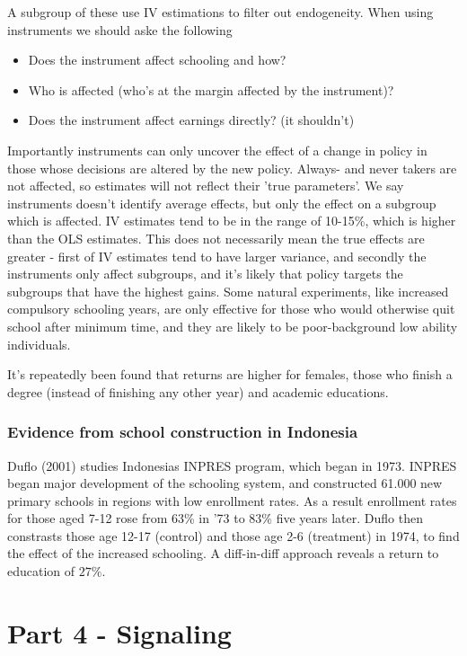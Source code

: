\documentclass[12pt, a4paper]{article}
\begin{document}
\begin{multicols}{2}
A subgroup of these use IV estimations to filter out endogeneity. When using instruments we should aske the following
\begin{itemize}
\item Does the instrument affect schooling and how?
\item Who is affected (who's at the margin affected by the instrument)?
\item Does the instrument affect earnings directly? (it shouldn't)
\end{itemize}
Importantly instruments can only uncover the effect of a change in policy in those whose decisions are altered by the new policy. Always- and never takers are not affected, so estimates will not reflect their 'true parameters'. We say instruments doesn't identify average effects, but only the effect on a subgroup which is affected. IV estimates tend to be in the range of 10-15\%, which is higher than the OLS estimates. This does not necessarily mean the true effects are greater - first of IV estimates tend to have larger variance, and secondly the instruments only affect subgroups, and it's likely that policy targets the subgroups that have the highest gains. 
Some natural experiments, like increased compulsory schooling years, are only effective for those who would otherwise quit school after minimum time, and they are likely to be poor-background low ability individuals. 

It's repeatedly been found that returns are higher for females, those who finish a degree (instead of finishing any other year) and academic educations.

\subsubsection{Evidence from school construction in Indonesia}
Duflo (2001) studies Indonesias INPRES program, which began in 1973. INPRES began major development of the schooling system, and constructed 61.000 new primary schools in regions with low enrollment rates. As a result enrollment rates for those aged 7-12 rose from 63\% in '73 to 83\% five years later. Duflo then constrasts those age 12-17 (control) and those age 2-6 (treatment) in 1974, to find the effect of the increased schooling. A diff-in-diff approach reveals a return to education of $27\%$.

\section{Part 4 - Signaling}

\end{multicols}
\end{document}
